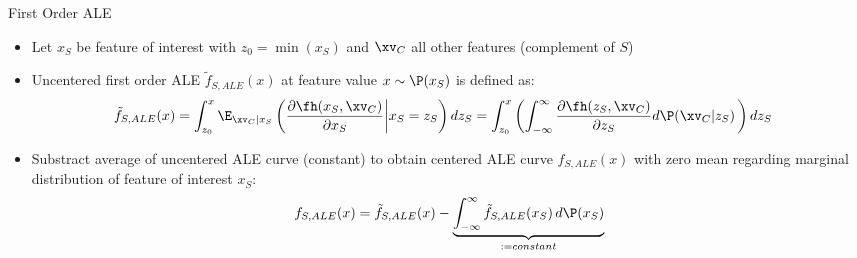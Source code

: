 \documentclass[11pt,compress,t,notes=noshow, aspectratio=169, xcolor=table]{beamer}
\begin{document}

\begin{frame}{First Order ALE}

\begin{itemize}
\item Let $x_S$ be feature of interest with $z_0 = \min(x_S)$ and $\xv_C$ all other features  (complement of $S$)
\item Uncentered first order ALE $\tilde{f}_{S, ALE}(x)$ at feature value $x \sim \P(x_S)$ is defined as:
$$
\begin{aligned}
\tilde{f}_{S, ALE}(x) &= \int_{z_{0}}^{x} \E_{\xv_C \vert x_S} \left(\frac{\partial \fh(x_S, \xv_C)}{\partial x_S} \bigg \vert x_S = z_S \right) dz_S = \int_{z_{0}}^{x} \left( \int_{-\infty}^{\infty}  \frac{\partial \fh(z_S, \xv_C)}{\partial z_S} d\P(\xv_C | z_S) \,   \right) dz_S
\end{aligned}
$$
\item Substract average of uncentered ALE curve (constant) to obtain centered ALE curve $f_{S, ALE}(x)$ with zero mean regarding marginal distribution of feature of interest $x_S$:
$$
\begin{aligned}
f_{S, ALE}(x) = \tilde{f}_{S, ALE}(x) - \underbrace{\int_{-\infty}^{\infty}\tilde{f}_{S, ALE}(x_S) \, d\P(x_S)}_{:= constant}
\end{aligned}
$$
\end{itemize}



\end{frame}

\end{document}
